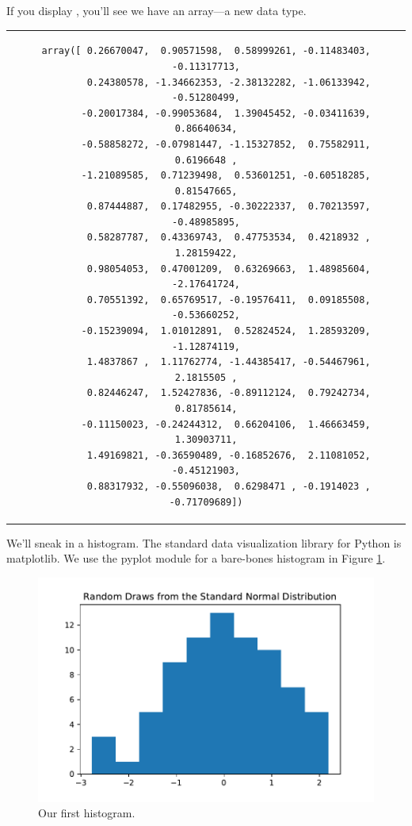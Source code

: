 \documentclass{article}
\begin{document}

\noindent If you display , you'll see we have an array---a new data type.

\begin{center}
\begin{tabular}{c}
\begin{lstlisting}[backgroundcolor=\color{white}, numbers = none]
    array([ 0.26670047,  0.90571598,  0.58999261, -0.11483403, -0.11317713,
        0.24380578, -1.34662353, -2.38132282, -1.06133942, -0.51280499,
       -0.20017384, -0.99053684,  1.39045452, -0.03411639,  0.86640634,
       -0.58858272, -0.07981447, -1.15327852,  0.75582911,  0.6196648 ,
       -1.21089585,  0.71239498,  0.53601251, -0.60518285,  0.81547665,
        0.87444887,  0.17482955, -0.30222337,  0.70213597, -0.48985895,
        0.58287787,  0.43369743,  0.47753534,  0.4218932 ,  1.28159422,
        0.98054053,  0.47001209,  0.63269663,  1.48985604, -2.17641724,
        0.70551392,  0.65769517, -0.19576411,  0.09185508, -0.53660252,
       -0.15239094,  1.01012891,  0.52824524,  1.28593209, -1.12874119,
        1.4837867 ,  1.11762774, -1.44385417, -0.54467961,  2.1815505 ,
        0.82446247,  1.52427836, -0.89112124,  0.79242734,  0.81785614,
       -0.11150023, -0.24244312,  0.66204106,  1.46663459,  1.30903711,
        1.49169821, -0.36590489, -0.16852676,  2.11081052, -0.45121903,
        0.88317932, -0.55096038,  0.6298471 , -0.1914023 , -0.71709689])
\end{lstlisting}
\end{tabular}
\end{center}


\noindent We'll sneak in a histogram. The standard data visualization library for Python is matplotlib. We use the pyplot module for a bare-bones histogram in Figure \ref{fig:hist}.



\begin{figure}
    \centering
    \includegraphics[width = .59\textwidth]{figures/first_histogram.pdf}
    \caption{Our first histogram.}
    \label{fig:hist}
\end{figure}
\end{document}

